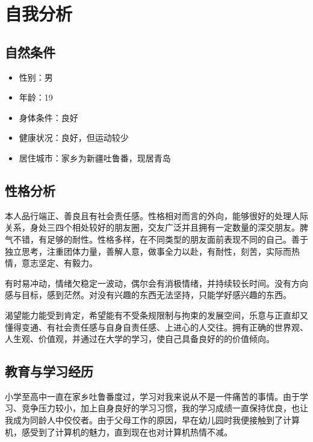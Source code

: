 \documentclass{article}
\begin{document}
\thispagestyle{empty}
\newpage

\setcounter{page}{1}

\section{自我分析}

\subsection{自然条件}

\begin{itemize}
    \item 性别：男
    \item 年龄：19
    \item 身体条件：良好
    \item 健康状况：良好，但运动较少
    \item 居住城市：家乡为新疆吐鲁番，现居青岛
\end{itemize}

\subsection{性格分析}

本人品行端正、善良且有社会责任感。性格相对而言的外向，能够很好的处理人际关系，身处三四个相处较好的朋友圈，交友广泛并且拥有一定数量的深交朋友。脾气不错，有足够的耐性。性格多样，在不同类型的朋友面前表现不同的自己。善于独立思考，注重团体力量，善解人意，做事全力以赴，有耐性，刻苦，实际而热情，意志坚定、有毅力。

有时易冲动，情绪欠稳定一波动，偶尔会有消极情绪，并持续较长时间。没有方向感与目标，感到茫然。对没有兴趣的东西无法坚持，只能学好感兴趣的东西。

渴望能力能受到肯定，希望能有不受条规限制与拘束的发展空间，乐意与正直却又懂得变通、有社会责任感与自身自责任感、上进心的人交往。拥有正确的世界观、人生观、价值观，并通过在大学的学习，使自己具备良好的的价值倾向。

\subsection{教育与学习经历}

小学至高中一直在家乡吐鲁番度过，学习对我来说从不是一件痛苦的事情。由于学习、竞争压力较小，加上自身良好的学习习惯，我的学习成绩一直保持优良，也让我成为同龄人中佼佼者。由于父母工作的原因，早在幼儿园时我便接触到了计算机，感受到了计算机的魅力，直到现在也对计算机热情不减。
\end{document}
